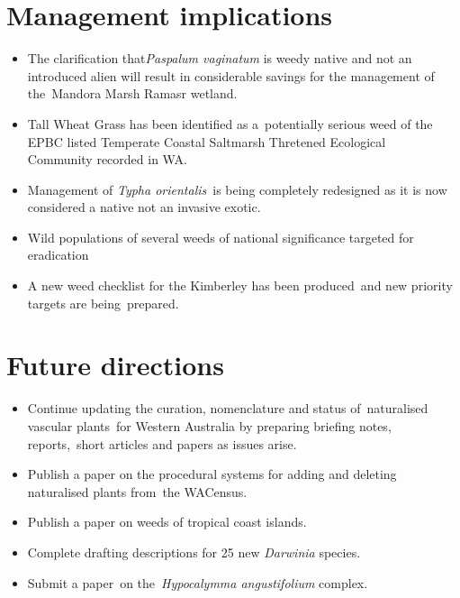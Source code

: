 \documentclass[version=last,
    paper=a4, %
    10pt, %
    usenames,
    dvipsnames,
    oneside, %
    headings=openany, %
    DIV=15 %
]{scrbook}
\begin{document}
\section*{Management implications}
\begin{itemize}
\itemsep1pt\parskip0pt
\item
  The clarification that\emph{Paspalum vaginatum} is weedy native and
  not an introduced alien will result in considerable savings for the
  management of the~Mandora Marsh Ramasr wetland.
\item
  Tall Wheat Grass has been identified as a~potentially serious weed of
  the EPBC listed Temperate Coastal Saltmarsh Thretened Ecological~
  Community recorded in WA.
\item
  Management of \emph{Typha orientalis}~is being completely redesigned
  as it is now considered a native not an invasive exotic.
\item
  Wild populations of several weeds of national significance targeted
  for eradication
\item
  A new weed checklist for the Kimberley has been produced~and new
  priority targets are being~prepared.
\end{itemize}



\section*{Future directions}
\begin{itemize}
\itemsep1pt\parskip0pt
\item
  Continue updating the curation, nomenclature and status of~naturalised
  vascular plants~for Western Australia by preparing briefing notes,
  reports,~short articles and papers as issues arise.
\item
  Publish a paper on the procedural systems for adding and deleting
  naturalised plants from~the WACensus.
\item
  Publish a paper on weeds of tropical coast islands.
\item
  Complete drafting descriptions for 25 new \emph{Darwinia} species.
\item
  Submit a paper~on the~\emph{Hypocalymma angustifolium} complex.
\end{itemize}



\end{document}
